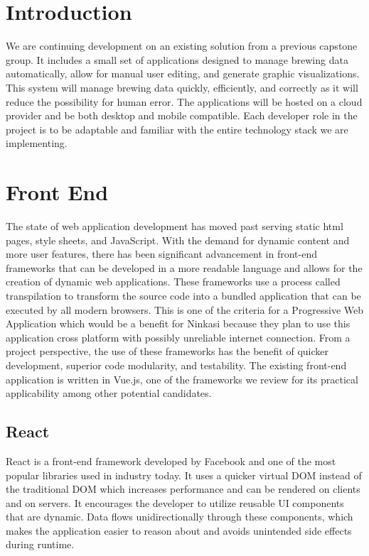 \section{Introduction}
We are continuing development on an existing solution from a previous capstone group. It includes a small set of applications designed to manage brewing data automatically, allow for manual user editing, and generate graphic visualizations. This system will manage brewing data quickly, efficiently, and correctly as it will reduce the possibility for human error. The applications will be hosted on a cloud provider and be both desktop and mobile compatible. Each developer role in the project is to be adaptable and familiar with the entire technology stack we are implementing.
\section{Front End}
The state of web application development has moved past serving static html pages, style sheets, and JavaScript. With the demand for dynamic content and more user features, there has been significant advancement in front-end frameworks that can be developed in a more readable language and allows for the creation of dynamic web applications. These frameworks use a process called transpilation to transform the source code into a bundled application that can be executed by all modern browsers. This is one of the criteria for a Progressive Web Application which would be a benefit for Ninkasi because they plan to use this application cross platform with possibly unreliable internet connection. From a project perspective, the use of these frameworks has the benefit of quicker development, superior code modularity, and testability. The existing front-end application is written in Vue.js, one of the frameworks we review for its practical applicability among other potential candidates.
    \subsection{React}
    React is a front-end framework developed by Facebook and one of the most popular libraries used in industry today. It uses a quicker virtual DOM instead of the traditional DOM which increases performance and can be rendered on clients and on servers. It encourages the developer to utilize reusable UI components that are dynamic. Data flows unidirectionally through these components, which makes the application easier to reason about and avoids unintended side effects during runtime. 
    
